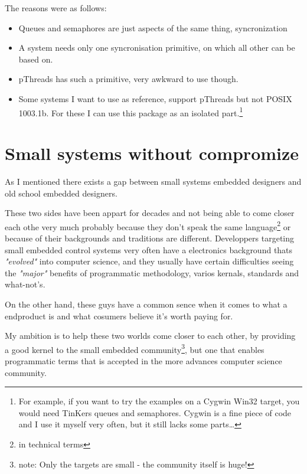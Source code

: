 The reasons were as follows:
\begin{itemize}
	\item Queues and semaphores are just aspects of the same thing, syncronization
	\item A system needs only one syncronisation primitive, on which all other can be based on.
	\item pThreads has such a primitive, very awkward to use though.
	\item Some systems I want to use as reference, support pThreads but not POSIX 1003.1b. For these I can use this package as an isolated part.\footnote{For example, if you want to try the examples on a Cygwin Win32 target, you would need TinKers queues and semaphores. Cygwin is a fine piece of code and I use it myself very often, but it still lacks some parts\ldots}
\end{itemize}


\chapter{Small systems without compromize}
As I mentioned there exists a gap between small systems embedded designers and old school embedded designers.

These two sides have been appart for decades and not being able to come closer each othe very much probably because they don't speak the same language\footnote{in technical terms} or because of their backgrounds and traditions are different. Developpers targeting small embedded control systems very often have a electronics background thats \textit{"evolved"} into computer science, and they usually have certain difficulties seeing the \textit{"major"} benefits of programmatic methodology, varios kernals, standards and what-not's.

On the other hand, these guys have a common sence when it comes to what a endproduct is and what cosumers believe it's worth paying for.

My ambition is to help these two worlds come closer to each other, by providing a good kernel to the small embedded community\footnote{note: Only the targets are small - the community itself is huge!}, but one that enables programmatic terms that is accepted in the more advances computer science community.

